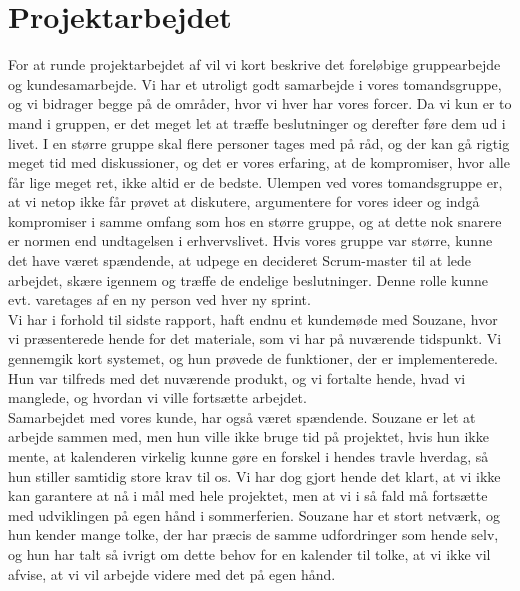 \documentclass[12pt]{article}   %
\begin{document}
\section{Projektarbejdet}
For at runde projektarbejdet af vil vi kort beskrive det foreløbige gruppearbejde og kundesamarbejde. Vi har et utroligt godt samarbejde i vores tomandsgruppe, og vi bidrager begge på de områder, hvor vi hver har vores forcer. Da vi kun er to mand i gruppen, er det meget let at træffe beslutninger og derefter føre dem ud i livet. I en større gruppe skal flere personer tages med på råd, og der kan gå rigtig meget tid med diskussioner, og det er vores erfaring, at de kompromiser, hvor alle får lige meget ret, ikke altid er de bedste. Ulempen ved vores tomandsgruppe er, at vi netop ikke får prøvet at diskutere, argumentere for vores ideer og indgå kompromiser i samme omfang som hos en større gruppe, og at dette nok snarere er normen end undtagelsen i erhvervslivet. Hvis vores gruppe var større, kunne det have været spændende, at udpege en decideret Scrum-master til at lede arbejdet, skære igennem og træffe de endelige beslutninger. Denne rolle kunne evt. varetages af en ny person ved hver ny sprint. \\
Vi har i forhold til sidste rapport, haft endnu et kundemøde med Souzane, hvor vi præsenterede hende for det materiale, som vi har på nuværende tidspunkt. Vi gennemgik kort systemet, og hun prøvede de funktioner, der er implementerede. Hun var tilfreds med det nuværende produkt, og vi fortalte hende, hvad vi manglede, og hvordan vi ville fortsætte arbejdet. \\
Samarbejdet med vores kunde, har også været spændende. Souzane er let at arbejde sammen med, men hun ville ikke bruge tid på projektet, hvis hun ikke mente, at kalenderen virkelig kunne gøre en forskel i hendes travle hverdag, så hun stiller samtidig store krav til os. Vi har dog gjort hende det klart, at vi ikke kan garantere at nå i mål med hele projektet, men at vi i så fald må fortsætte med udviklingen på egen hånd i sommerferien. Souzane har et stort netværk, og hun kender mange tolke, der har præcis de samme udfordringer som hende selv, og hun har talt så ivrigt om dette behov for en kalender til tolke, at vi ikke vil afvise, at vi vil arbejde videre med det på egen hånd. \\ 
\end{document}
